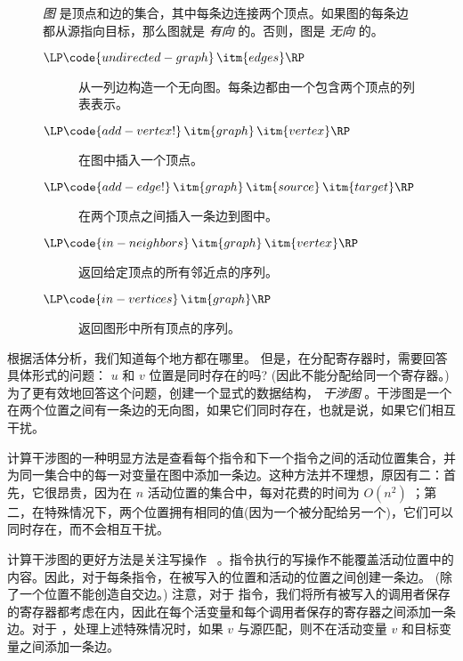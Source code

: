 \documentclass[11pt]{book}
\begin{document}
\begin{wrapfigure}[18]{r}[1.0in]{0.6\textwidth}
  \small
  \begin{tcolorbox}[title=\href{https://docs.racket-lang.org/graph/index.html}{ Racket 图形库}]
     \emph{图} 是顶点和边的集合，其中每条边连接两个顶点。如果图的每条边都从源指向目标，那么图就是 \emph{有向} 的。否则，图是
    \emph{无向} 的。
  \begin{description}
  \item[$\LP\code{undirected-graph}\,\itm{edges}\RP$] 从一列边构造一个无向图。每条边都由一个包含两个顶点的列表表示。
  \item[$\LP\code{add-vertex!}\,\itm{graph}\,\itm{vertex}\RP$]
    在图中插入一个顶点。
  \item[$\LP\code{add-edge!}\,\itm{graph}\,\itm{source}\,\itm{target}\RP$]
   在两个顶点之间插入一条边到图中。
  \item[$\LP\code{in-neighbors}\,\itm{graph}\,\itm{vertex}\RP$]
   返回给定顶点的所有邻近点的序列。
  \item[$\LP\code{in-vertices}\,\itm{graph}\RP$]
  返回图形中所有顶点的序列。
  \end{description}
\end{tcolorbox}
\end{wrapfigure}

根据活体分析，我们知道每个地方都在哪里。
但是，在分配寄存器时，需要回答具体形式的问题： $u$ 和 $v$ 位置是同时存在的吗?
(因此不能分配给同一个寄存器。) 为了更有效地回答这个问题，创建一个显式的数据结构， \emph{干涉图} 。干涉图是一个在两个位置之间有一条边的无向图，如果它们同时存在，也就是说，如果它们相互干扰。

计算干涉图的一种明显方法是查看每个指令和下一个指令之间的活动位置集合，并为同一集合中的每一对变量在图中添加一条边。这种方法并不理想，原因有二：首先，它很昂贵，因为在
 $n$ 活动位置的集合中，每对花费的时间为 $O(n^2)$ ；第二，在特殊情况下，两个位置拥有相同的值(因为一个被分配给另一个)，它们可以同时存在，而不会相互干扰。

计算干涉图的更好方法是关注写操作~\citep{Appel:2003fk} 。指令执行的写操作不能覆盖活动位置中的内容。因此，对于每条指令，在被写入的位置和活动的位置之间创建一条边。 (除了一个位置不能创造自交边。) 注意，对于  指令，我们将所有被写入的调用者保存的寄存器都考虑在内，因此在每个活变量和每个调用者保存的寄存器之间添加一条边。对于
 ，处理上述特殊情况时，如果 $v$ 与源匹配，则不在活动变量 $v$
和目标变量之间添加一条边。
\end{document}

